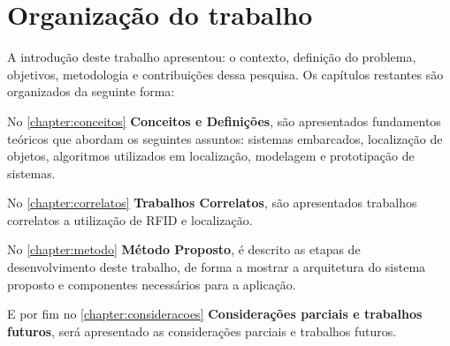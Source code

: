 \begin{comment}
\section{Metodologia Proposta}

\section{Contribuições propostas}
As contribuições propostas deste trabalho são:
\begin{enumerate}
    \item A implementação de um sistema para localização de objetos. O Metódo utilizado visa localizar objeto sem alta precisão, porém é viável para controle de acervos.
    \item O sistema desevolvido pode auxiliar no controle e ainda facilitar o levantamento de todos os bens do proprietário.
\end{enumerate}

\end{comment}
\section{Organização do trabalho}
A introdução deste trabalho apresentou: o contexto, definição do problema, objetivos, metodologia e contribuições dessa pesquisa. Os capítulos restantes são organizados da seguinte forma:

\par
No \autoref{chapter:conceitos} \textbf{Conceitos e Definições}, são apresentados fundamentos teóricos que abordam os seguintes assuntos: sistemas embarcados, localização de objetos, algoritmos utilizados em localização, modelagem e prototipação de sistemas.

\par
No \autoref{chapter:correlatos} \textbf{Trabalhos Correlatos}, são apresentados trabalhos correlatos a utilização de RFID e localização.

\par
No \autoref{chapter:metodo} \textbf{Método Proposto}, é descrito as etapas de desenvolvimento deste trabalho, de forma a mostrar a arquitetura do sistema proposto e componentes necessários para a aplicação.

\par
\par
E por fim no \autoref{chapter:consideracoes} \textbf{Considerações parciais e trabalhos futuros}, será apresentado as considerações parciais e trabalhos futuros.
